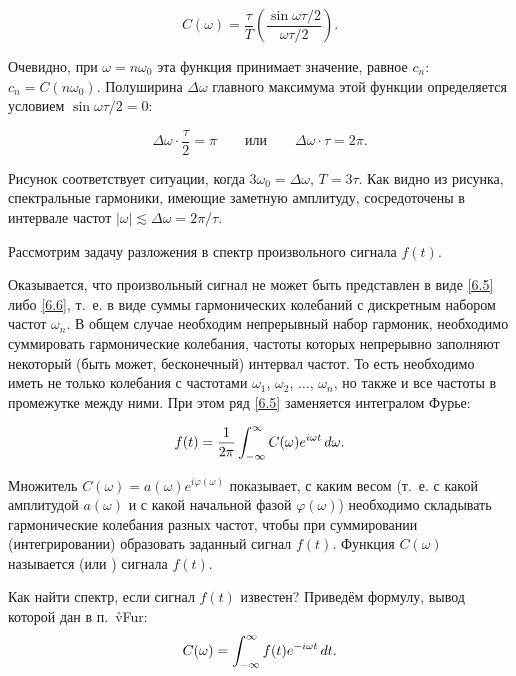 \begin{equation*}
	C(\omega) =\frac{\tau}{T}\left(\frac{\sin\omega\tau/2}{\omega\tau/2}\right).
\end{equation*}

Очевидно, при $\omega=n\omega_0$ эта функция принимает значение, равное $c_n$: $c_n=C(n\omega_0)$. Полуширина $\Delta
\omega$ главного максимума этой функции определяется условием $\sin\omega\tau/2=0$:

\begin{equation*}
	\Delta\omega \cdot \frac{\tau}{2}=\pi\qquad \text{или} \qquad \Delta \omega \cdot \tau =2\pi.
\end{equation*}

Рисунок соответствует ситуации, когда $3\omega_0=\Delta\omega$, $T=3\tau$. Как видно из рисунка, спектральные гармоники,
имеющие заметную амплитуду, сосредоточены в интервале частот $|\omega|\lesssim \Delta\omega=2\pi/\tau$.


Рассмотрим задачу разложения в спектр произвольного сигнала $f(t)$.

Оказывается, что произвольный сигнал не может быть представлен в виде \eqref{6.5} либо \eqref{6.6}, т.~е. в виде суммы
гармонических колебаний с дискретным набором частот $\omega_n$. В общем случае необходим непрерывный набор гармоник,
необходимо суммировать гармонические колебания, частоты которых непрерывно заполняют некоторый (быть может, бесконечный)
интервал частот. То есть необходимо иметь не только колебания с частотами $\omega_1$, $\omega_2$, $\dots$, $\omega_n$,
но также и все частоты в промежутке между ними. При этом ряд \eqref{6.5} заменяется интегралом Фурье:

\begin{equation}
	\eqmark{6.15}
	f(t)=\frac{1}{2\pi}\int_{-\infty}^\infty C(\omega)e^{i\omega t}\,d\omega.
\end{equation}

Множитель $C(\omega)=a(\omega)e^{i\varphi(\omega)}$ показывает, с каким весом (т.~е. с какой амплитудой $a(\omega)$ и с
какой начальной фазой $\varphi(\omega)$) необходимо складывать гармонические колебания разных частот, чтобы при суммировании
(интегрировании) образовать заданный сигнал $f(t)$. Функция $C(\omega)$ называется  (или
) сигнала $f(t)$.

Как найти спектр, если сигнал $f(t)$ известен? Приведём формулу, вывод которой дан в п.~\r{vFur}:
\begin{equation}
	\eqmark{6.16}
	C(\omega)=\int_{-\infty}^\infty f(t)e^{-i\omega t}\,dt.
\end{equation}

